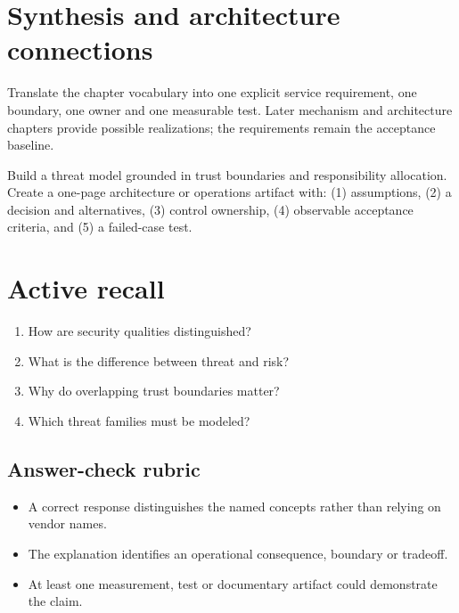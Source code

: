 \documentclass[10pt,letterpaper]{article}
\begin{document}
\section{Synthesis and architecture connections}
Translate the chapter vocabulary into one explicit service requirement, one boundary, one owner and one measurable test. Later mechanism and architecture chapters provide possible realizations; the requirements remain the acceptance baseline.
\begin{workbox}[title={Applied deliverable}]
Build a threat model grounded in trust boundaries and responsibility allocation.\\[4pt]Create a one-page architecture or operations artifact with: (1) assumptions, (2) a decision and alternatives, (3) control ownership, (4) observable acceptance criteria, and (5) a failed-case test.
\end{workbox}
\section{Active recall}
\begin{enumerate}
\item How are security qualities distinguished?
\item What is the difference between threat and risk?
\item Why do overlapping trust boundaries matter?
\item Which threat families must be modeled?
\end{enumerate}
\subsection{Answer-check rubric}
\begin{itemize}
\item A correct response distinguishes the named concepts rather than relying on vendor names.
\item The explanation identifies an operational consequence, boundary or tradeoff.
\item At least one measurement, test or documentary artifact could demonstrate the claim.
\end{itemize}
\end{document}
